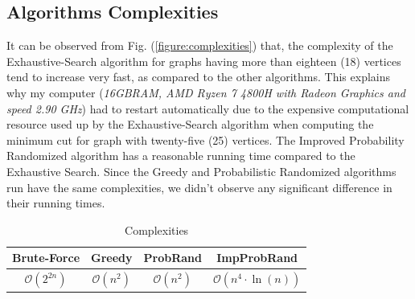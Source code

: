 \documentclass[longpaper, english, final, times]{revdetua}
\begin{document}
		\subsection{Algorithms Complexities}
			It can be observed from Fig. (\ref{figure:complexities}) that, the complexity of the Exhaustive-Search algorithm for graphs having more than eighteen (18) vertices tend to increase very fast, as compared to the other algorithms. This explains why my computer (\textit{16GBRAM, AMD Ryzen 7 4800H with Radeon Graphics and speed 2.90 GHz}) had to restart automatically due to the expensive computational resource used up by the Exhaustive-Search algorithm when computing the minimum cut for graph with twenty-five (25) vertices. The Improved Probability Randomized algorithm has a reasonable running time compared to the Exhaustive Search. Since the Greedy and Probabilistic Randomized algorithms run have the same complexities, we didn't observe any significant difference in their running times. 
			\begin{table}[h]
				\caption{Complexities}
				\label{table:computationalComplexities}
				{\renewcommand{\arraystretch}{2}
					\begin{tabular}{|c|c|c|c|}
						\hline
						Brute-Force & Greedy & ProbRand & ImpProbRand\\
						\hline
						$\mathcal{O}\left(2^{2n}\right)$&
						$\mathcal{O}(n^2)$&$\mathcal{O}(n^2)$&$\mathcal{O}\left(n^4\cdot \ln(n)\right)$\\
						\hline
					\end{tabular}
				}
			\end{table}
\end{document}

